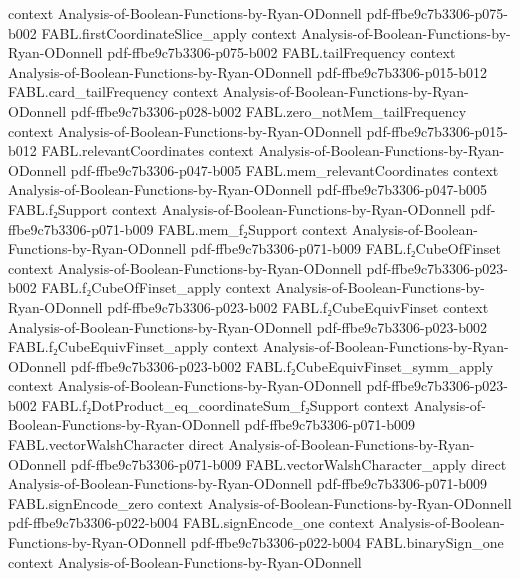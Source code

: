 \begin{theorem}
  {context}
  {Analysis-of-Boolean-Functions-by-Ryan-ODonnell}
  {pdf-ffbe9c7b3306-p075-b002}
\proofstep
  {FABL.firstCoordinateSlice_apply}
  {context}
  {Analysis-of-Boolean-Functions-by-Ryan-ODonnell}
  {pdf-ffbe9c7b3306-p075-b002}
\proofstep
  {FABL.tailFrequency}
  {context}
  {Analysis-of-Boolean-Functions-by-Ryan-ODonnell}
  {pdf-ffbe9c7b3306-p015-b012}
\proofstep
  {FABL.card_tailFrequency}
  {context}
  {Analysis-of-Boolean-Functions-by-Ryan-ODonnell}
  {pdf-ffbe9c7b3306-p028-b002}
\proofstep
  {FABL.zero_notMem_tailFrequency}
  {context}
  {Analysis-of-Boolean-Functions-by-Ryan-ODonnell}
  {pdf-ffbe9c7b3306-p015-b012}
\proofstep
  {FABL.relevantCoordinates}
  {context}
  {Analysis-of-Boolean-Functions-by-Ryan-ODonnell}
  {pdf-ffbe9c7b3306-p047-b005}
\proofstep
  {FABL.mem_relevantCoordinates}
  {context}
  {Analysis-of-Boolean-Functions-by-Ryan-ODonnell}
  {pdf-ffbe9c7b3306-p047-b005}
\proofstep
  {FABL.f₂Support}
  {context}
  {Analysis-of-Boolean-Functions-by-Ryan-ODonnell}
  {pdf-ffbe9c7b3306-p071-b009}
\proofstep
  {FABL.mem_f₂Support}
  {context}
  {Analysis-of-Boolean-Functions-by-Ryan-ODonnell}
  {pdf-ffbe9c7b3306-p071-b009}
\proofstep
  {FABL.f₂CubeOfFinset}
  {context}
  {Analysis-of-Boolean-Functions-by-Ryan-ODonnell}
  {pdf-ffbe9c7b3306-p023-b002}
\proofstep
  {FABL.f₂CubeOfFinset_apply}
  {context}
  {Analysis-of-Boolean-Functions-by-Ryan-ODonnell}
  {pdf-ffbe9c7b3306-p023-b002}
\proofstep
  {FABL.f₂CubeEquivFinset}
  {context}
  {Analysis-of-Boolean-Functions-by-Ryan-ODonnell}
  {pdf-ffbe9c7b3306-p023-b002}
\proofstep
  {FABL.f₂CubeEquivFinset_apply}
  {context}
  {Analysis-of-Boolean-Functions-by-Ryan-ODonnell}
  {pdf-ffbe9c7b3306-p023-b002}
\proofstep
  {FABL.f₂CubeEquivFinset_symm_apply}
  {context}
  {Analysis-of-Boolean-Functions-by-Ryan-ODonnell}
  {pdf-ffbe9c7b3306-p023-b002}
\proofstep
  {FABL.f₂DotProduct_eq_coordinateSum_f₂Support}
  {context}
  {Analysis-of-Boolean-Functions-by-Ryan-ODonnell}
  {pdf-ffbe9c7b3306-p071-b009}
\proofstep
  {FABL.vectorWalshCharacter}
  {direct}
  {Analysis-of-Boolean-Functions-by-Ryan-ODonnell}
  {pdf-ffbe9c7b3306-p071-b009}
\proofstep
  {FABL.vectorWalshCharacter_apply}
  {direct}
  {Analysis-of-Boolean-Functions-by-Ryan-ODonnell}
  {pdf-ffbe9c7b3306-p071-b009}
\proofstep
  {FABL.signEncode_zero}
  {context}
  {Analysis-of-Boolean-Functions-by-Ryan-ODonnell}
  {pdf-ffbe9c7b3306-p022-b004}
\proofstep
  {FABL.signEncode_one}
  {context}
  {Analysis-of-Boolean-Functions-by-Ryan-ODonnell}
  {pdf-ffbe9c7b3306-p022-b004}
\proofstep
  {FABL.binarySign_one}
  {context}
  {Analysis-of-Boolean-Functions-by-Ryan-ODonnell}

\end{theorem}
